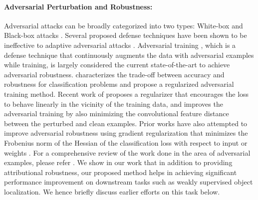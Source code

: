 \documentclass[runningheads]{llncs}
\begin{document}
\paragraph{\textbf{Adversarial Perturbation and Robustness:}}
Adversarial attacks can be broadly categorized into two types: White-box \cite{seyed2016deepfool,madrypgd,carlini2017towards,sal_adv_structure} and Black-box attacks \cite{blackbox4,spsa_blackbox,alexey2017blackbox,papernot2017blackbox1}. Several proposed defense techniques have been shown to be ineffective to adaptive adversarial attacks \cite{obfuscate,break_alp,carlini2017towards,carlini2019evaluating}. Adversarial training \cite{goodfellow2014explaining,madrypgd,sinha2019harnessing}, which is a defense technique that continuously augments the data with adversarial examples while training, is largely considered the current state-of-the-art to achieve adversarial robustness. \cite{Zhang2019trades} characterizes the trade-off between accuracy and robustness for classification problems and propose a regularized adversarial training method. Recent work of \cite{curvature_2} proposes a regularizer that encourages the loss to behave linearly in the vicinity of the training data, and \cite{feature_fb_scatter} improves the adversarial training by also minimizing the convolutional feature distance between the perturbed and clean examples. Prior works have also attempted to improve adversarial robustness using gradient regularization that minimizes the Frobenius norm of the Hessian of the classification loss with respect to input\cite{hessian2018aaai,hessian2019cure,hessian2015unified} or weights \cite{hessian2018jacobian}. For a comprehensive review of the work done in the area of adversarial examples, please refer \cite{reviewpaper,reviewpaper2}. We show in our work that in addition to providing attributional robustness, our proposed method helps in achieving significant performance improvement on downstream tasks such as weakly supervised object localization. We hence briefly discuss earlier efforts on this task below.
\end{document}
